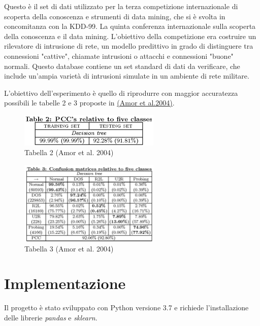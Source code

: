 \documentclass[a4paper,12pt]{article}
\begin{document}
Questo è il set di dati utilizzato per la terza competizione internazionale di scoperta della conoscenza e strumenti di data mining, che si è svolta in concomitanza con la KDD-99. La quinta conferenza internazionale sulla scoperta della conoscenza e il data mining. L'obiettivo della competizione era costruire un rilevatore di intrusione di rete, un modello predittivo in grado di distinguere tra connessioni "cattive", chiamate intrusioni o attacchi e connessioni "buone" normali. Questo database contiene un set standard di dati da verificare, che include un'ampia varietà di intrusioni simulate in un ambiente di rete militare.
\newline

L'obiettivo dell'esperimento è quello di riprodurre con maggior accuratezza possibili le tabelle 2 e 3 proposte in \href{https://www.semanticscholar.org/paper/Naive-Bayes-vs-decision-trees-in-intrusion-systems-Amor-Benferhat/16a778c5d83cce2f4c4af46efafb927e7d0d8e60}{(Amor et al.2004)}.
\
\begin{figure}[h]
    \centering
    \captionsetup{justification=centering, margin=1cm}
    \includegraphics[width=0.6\textwidth]{./Table2}
    \vspace*{5mm}
    \caption{Tabella 2 (Amor et al. 2004)}
    \label{fig:dec}
\end{figure}
\newline
\begin{figure}[h]
    \centering
    \captionsetup{justification=centering, margin=1cm}
    \includegraphics[width=0.6\textwidth]{./Table3}
    \vspace*{5mm}
    \caption{Tabella 3 (Amor et al. 2004)}
    \label{fig:dec}
\end{figure}
\newline

\section{Implementazione}
Il progetto è stato sviluppato con Python versione 3.7 e richiede l'installazione delle librerie
\textit{pandas} e \textit{sklearn}.
\end{document}
